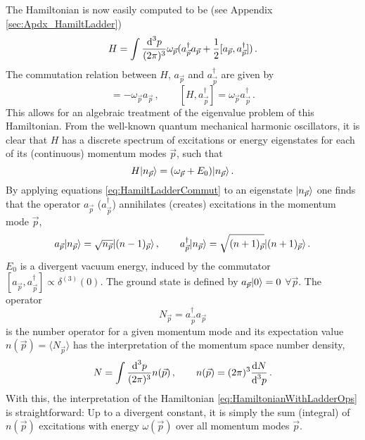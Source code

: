The Hamiltonian is now easily computed to be (see Appendix \ref{sec:Apdx_HamiltLadder})
\begin{equation}
        H=\int\frac{\text{d}^3p}{(2\pi)^3}\omega_{\vec{p}}(a_{\vec{p}}^\dagger a_{\vec{p}}+\frac{1}{2}[a_{\vec{p}},a_{\vec{p}}^\dagger])\,.
        \label{eq:HamiltonianWithLadderOps}
\end{equation}
The commutation relation between $H$, $a_{\vec{p}}$ and $a_{\vec{p}}^\dagger$ are given by
\begin{equation}
    [H,a_{\vec{p}}]=-\omega_{\vec{p}}a_{\vec{p}}\,,\qquad[H,a_{\vec{p}}^\dagger]=\omega_{\vec{p}}a_{\vec{p}}^\dagger\,.
    \label{eq:HamiltLadderCommut}
\end{equation}
This allows for an algebraic treatment of the eigenvalue problem of this Hamiltonian. From the well-known quantum mechanical harmonic oscillators, it is clear that $H$ has a discrete spectrum of excitations or energy eigenstates for each of its (continuous) momentum modes $\vec{p}$, such that
\begin{equation}
    H{\lvert n_{\vec{p}}\rangle}=(\omega_{\vec{p}}+E_0){\lvert n_{\vec{p}}\rangle}\,.
\end{equation}
By applying equations \eqref{eq:HamiltLadderCommut} to an eigenstate ${\lvert n_{\vec{p}}\rangle}$ one finds that the operator $a_{\vec{p}}$ ($a_{\vec{p}}^\dagger$) annihilates (creates) excitations in the momentum mode $\vec{p}$,
\begin{equation}
    a_{\vec{p}}{\lvert n_{\vec{p}}\rangle}=\sqrt{n_{\vec{p}}} {\lvert(n-1)_{\vec{p}}\rangle}\,,\qquad a_{\vec{p}}^\dagger{\lvert n_{\vec{p}}\rangle}= \sqrt{(n+1)_{\vec{p}}}{\lvert(n+1)_{\vec{p}}\rangle}\,.
\end{equation}
$E_0$ is a divergent vacuum energy, induced by the commutator ${[a_{\vec{p}},a_{\vec{p}}^\dagger]\propto\delta^{(3)}(0)}$. The ground state is defined by $a_{\vec{p}}{\lvert0\rangle}=0$ $\forall\vec{p}$. The operator
\begin{equation}
    N_{\vec{p}}=a_{\vec{p}}^\dagger a_{\vec{p}}
\end{equation}
is the number operator for a given momentum mode and its expectation value $n(\vec{p})=\langle N_{\vec{p}}\rangle$ has the interpretation of the momentum space number density,
\begin{equation}
    N=\int\frac{\text{d}^3p}{(2\pi)^3}n(\vec{p})\,,\qquad n(\vec{p})=(2\pi)^3\frac{\text{d} N}{\text{d}^3p}\,.
    \label{eq:NumberDensity}
\end{equation}
With this, the interpretation of the Hamiltonian \eqref{eq:HamiltonianWithLadderOps} is straightforward: Up to a divergent constant, it is simply the sum (integral) of ${n(\vec{p})}$ excitations with energy ${\omega(\vec{p})}$ over all momentum modes $\vec{p}$.

